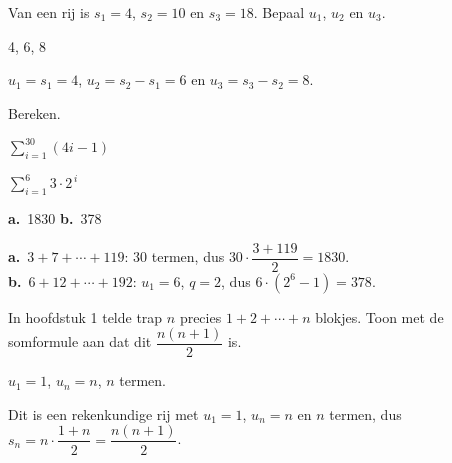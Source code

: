 \begin{oefeningen}
\begin{oefening}[1]
Van een rij is $s_1 = 4$, $s_2 = 10$ en $s_3 = 18$. Bepaal $u_1$, $u_2$ en $u_3$.
\begin{solution}
4, 6, 8
\end{solution}
\begin{fullsolution}
$u_1=s_1=4$, $u_2=s_2-s_1=6$ en $u_3=s_3-s_2=8$.
\end{fullsolution}
\end{oefening}

\begin{oefening}[1]
Bereken.
\begin{reeks}[2]
  \item $\displaystyle\sum_{i=1}^{30} (4i - 1)$
  \item $\displaystyle\sum_{i=1}^{6} 3 \cdot 2^{\,i}$
\end{reeks}
\begin{solution}
\textbf{a.}~1830 \quad \textbf{b.}~378
\end{solution}
\begin{fullsolution}
\textbf{a.}~$3+7+\cdots+119$: 30 termen, dus $30\cdot\dfrac{3+119}{2}=1830$.\\
\textbf{b.}~$6+12+\cdots+192$: $u_1=6$, $q=2$, dus $6\cdot(2^6-1)=378$.
\end{fullsolution}
\end{oefening}

\begin{oefening}[1]
In hoofdstuk 1 telde trap $n$ precies $1 + 2 + \cdots + n$ blokjes. Toon met de somformule aan dat dit $\dfrac{n(n+1)}{2}$ is.
\begin{solution}
$u_1=1$, $u_n=n$, $n$ termen.
\end{solution}
\begin{fullsolution}
Dit is een rekenkundige rij met $u_1=1$, $u_n=n$ en $n$ termen, dus $s_n=n\cdot\dfrac{1+n}{2}=\dfrac{n(n+1)}{2}$.
\end{fullsolution}
\end{oefening}


\end{oefeningen}
